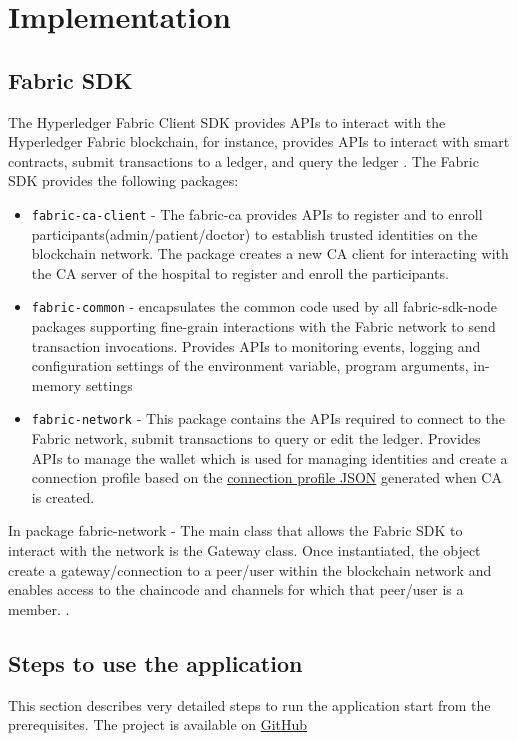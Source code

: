 \chapter{Implementation}
\label{ch:implementation}

\section{Fabric SDK}
\label{sec:implementation:sdk}
The Hyperledger Fabric Client SDK provides APIs to interact with the Hyperledger Fabric blockchain, for instance, provides APIs to interact with smart contracts, submit transactions to a ledger, and query the ledger \cite{fabric-sdk-node}. The Fabric SDK provides the following packages:
\begin{itemize}
    \item \lstinline{fabric-ca-client} - The fabric-ca provides APIs to register and to enroll participants(admin/patient/doctor) to establish trusted identities on the blockchain network. The package creates a new CA client for interacting with the CA server of the hospital to register and enroll the participants. 
    \item \lstinline{fabric-common} - encapsulates the common code used by all fabric-sdk-node packages supporting fine-grain interactions with the Fabric network to send transaction invocations. Provides APIs to monitoring events, logging and configuration settings of the environment variable, program arguments, in-memory settings
    \item \lstinline{fabric-network} - This package contains the APIs required to connect to the Fabric network, submit transactions to query or edit  the ledger. Provides APIs to manage the wallet which is used for managing identities and create a connection profile based on the \href{https://github.com/kshitijyelpale/blockchain-hyperledger-fabric-electronic-patient-records/blob/main/app/first-network/organizations/ccp-template.json}{connection profile JSON} generated when CA is created.
\end{itemize}
In package fabric-network - The main class that allows the Fabric SDK to interact with the network is the Gateway class. Once instantiated, the object create a gateway/connection to a peer/user within the blockchain network and enables access to the chaincode and channels for which that peer/user is a member.  \cite{fabric-sdk-node}.



%
%
\section{Steps to use the application}
\label{sec:implementation:steps}
This section describes very detailed steps to run the application start from the prerequisites. The project is available on \href{https://github.com/kshitijyelpale/blockchain-hyperledger-fabric-electronic-patient-records}{GitHub} 

